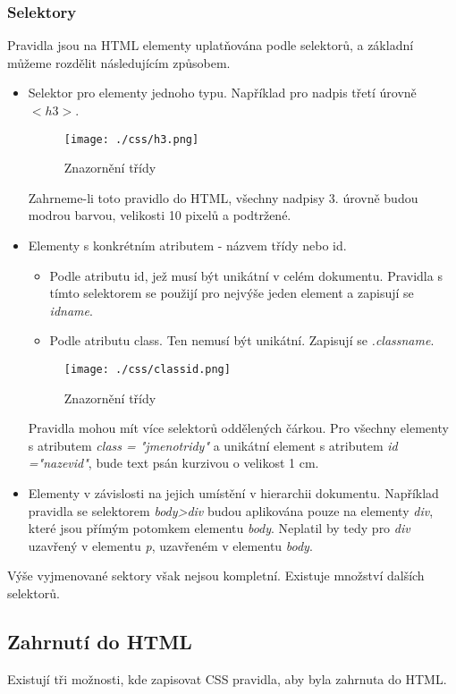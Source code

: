 \documentclass[main.tex]{subfiles}
\begin{document}
	\subsubsection{Selektory}
Pravidla jsou na HTML elementy uplatňována podle selektorů, a základní můžeme rozdělit následujícím způsobem.
\begin{itemize}
	\item Selektor pro elementy jednoho typu. Například pro nadpis třetí úrovně  $<h3>$.
		\begin{figure}[h]
			\centering
			\texttt{[image: ./css/h3.png]}
			\caption{Znazornění třídy}
		\end{figure}
		Zahrneme-li toto pravidlo do HTML, všechny nadpisy 3. úrovně budou modrou barvou, velikosti 10 pixelů a podtržené.
	\item Elementy s konkrétním atributem - názvem třídy nebo id.
		\begin{itemize}
			\item Podle atributu id, jež musí být unikátní v celém dokumentu. Pravidla s tímto selektorem se použijí pro nejvýše jeden element a zapisují se \textit{idname}. %
			\item Podle atributu class. Ten nemusí být unikátní. Zapisují se \textit{.classname}.
		\end{itemize}


		\begin{figure}[h]
			\centering
			\texttt{[image: ./css/classid.png]}
			\caption{Znazornění třídy}
		\end{figure}
		Pravidla mohou mít více selektorů oddělených čárkou. Pro všechny elementy s atributem \textit{class = "jmenotridy"} a unikátní element s atributem \textit{id ="nazevid"}, bude text psán kurzivou o velikost 1 cm.
	\item Elementy v závislosti na jejich umístění v hierarchii dokumentu. Například pravidla se selektorem \textit{body>div} budou aplikována pouze na elementy \textit{div}, které jsou přímým potomkem elementu \textit{body}. Neplatil by tedy pro \textit{div} uzavřený v elementu \textit{p}, uzavřeném v elementu \textit{body}.
\end{itemize}
Výše vyjmenované sektory však nejsou kompletní. Existuje množství dalších selektorů. \cite{web:cz:selektory}

\subsection{Zahrnutí do HTML}
Existují tři možnosti, kde zapisovat CSS pravidla, aby byla zahrnuta do HTML.
\end{document}

